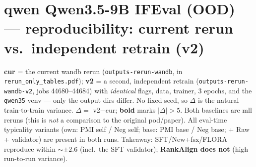 \documentclass[10pt]{article}
\begin{document}
\section*{qwen Qwen3.5-9B IFEval (OOD) --- reproducibility: current rerun vs.\ independent retrain (v2)}
{\footnotesize \textbf{cur} = the current wandb rerun (\texttt{outputs-rerun-wandb}, in
\texttt{rerun\_only\_tables.pdf}); \textbf{v2} = a second, independent retrain
(\texttt{outputs-rerun-wandb-v2}, jobs 44680--44684) with \emph{identical} flags, data,
trainer, 3 epochs, and the \texttt{qwen35} venv --- only the output dirs differ. No fixed
seed, so $\Delta$ is the natural train-to-train variance. $\Delta=$ v2$-$cur; \textbf{bold}
marks $|\Delta|>5$. Both baselines are mll reruns (this is \emph{not} a comparison to the
original pod/paper). All eval-time typicality variants (own: PMI self / Neg self; base: PMI base
/ Neg base; + Raw + validator) are present in both runs. Takeaway: SFT/New+fsx/FLORA reproduce
within $\sim\pm2.6$ (incl.\ the SFT validator); \textbf{RankAlign does not} (high run-to-run variance).}
\end{document}
